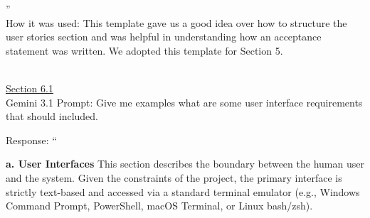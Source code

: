 ''\\
How it was used: This template gave us a good idea over how to structure
the user stories section and was helpful in understanding how an
acceptance statement was written. We adopted this template for Section
5.\\
\strut \\
\ul{Section 6.1}\\
Gemini 3.1 Prompt: Give me examples what are some user interface
requirements that should included.

Response: ``

\textbf{a. User Interfaces} This section describes the boundary between
the human user and the system. Given the constraints of the project, the
primary interface is strictly text-based and accessed via a standard
terminal emulator (e.g., Windows Command Prompt, PowerShell, macOS
Terminal, or Linux bash/zsh).

